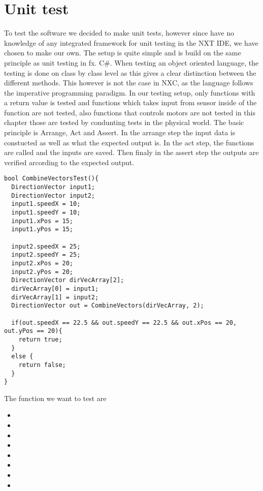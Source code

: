 \chapter{Unit test}

To test the \name software we decided to make unit tests, however since have no
knowledge of any integrated framework for unit testing in the NXT IDE, we
have chosen to make our own. The setup is quite simple and is build on the same
principle as unit testing in fx. C\#. When testing an object oriented
language, the testing is done on class by class level as this gives a clear
distinction between the different methods. This however is not the case in NXC,
as the language follows the imperative programming paradigm. In our testing
setup, only functions with a return value is tested and functions which takes input from
sensor inside of the function are not tested, also functions that controls
motors are not tested in this chapter those are tested by condunting tests in
the physical world.
The basic principle is Arrange, Act and Assert. In the arrange step the input
data is constucted as well as what the expected output is. In the act step, the
functions are called and the inputs are saved. Then finaly in the assert step
the outputs are verified arcording to the expected output. \nl

\begin{minipage}[H]{\linewidth}
\begin{lstlisting}[caption =Unit Test for Combine Vectors,label=combineVectorsTest] 
bool CombineVectorsTest(){
  DirectionVector input1;
  DirectionVector input2;
  input1.speedX = 10;
  input1.speedY = 10;
  input1.xPos = 15;
  input1.yPos = 15;
  
  input2.speedX = 25;
  input2.speedY = 25;
  input2.xPos = 20;
  input2.yPos = 20;
  DirectionVector dirVecArray[2];
  dirVecArray[0] = input1;
  dirVecArray[1] = input2;
  DirectionVector out = CombineVectors(dirVecArray, 2);
  
  if(out.speedX == 22.5 && out.speedY == 22.5 && out.xPos == 20, out.yPos == 20){
    return true;
  }
  else {
    return false;
  }
}
\end{lstlisting}
\end{minipage}

The function we want to test are

\begin{itemize}
  \item {}
  \item {}
  \item {}
  \item {}
  \item {}
  \item {}
  \item {}
  \item {}
\end{itemize} 

